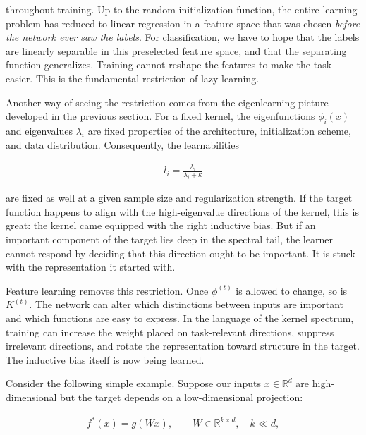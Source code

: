 throughout training. Up to the random initialization function, the entire learning problem has reduced to linear regression in a feature space that was chosen \textit{before the network ever saw the labels}. For classification, we have to hope that the labels are linearly separable in this preselected feature space, and that the separating function generalizes. Training cannot reshape the features to make the task easier. This is the fundamental restriction of lazy learning.

Another way of seeing the restriction comes from the eigenlearning picture developed in the previous section. For a fixed kernel, the eigenfunctions $\phi_i(x)$ and eigenvalues $\lambda_i$ are fixed properties of the architecture, initialization scheme, and data distribution. Consequently, the learnabilities

\begin{align}
    l_i = \frac{\lambda_i}{\lambda_i+\kappa}
\end{align}

are fixed as well at a given sample size and regularization strength. If the target function happens to align with the high-eigenvalue directions of the kernel, this is great: the kernel came equipped with the right inductive bias. But if an important component of the target lies deep in the spectral tail, the learner cannot respond by deciding that this direction ought to be important. It is stuck with the representation it started with.

Feature learning removes this restriction. Once $\phi^{(t)}$ is allowed to change, so is $K^{(t)}$. The network can alter which distinctions between inputs are important and which functions are easy to express. In the language of the kernel spectrum, training can increase the weight placed on task-relevant directions, suppress irrelevant directions, and rotate the representation toward structure in the target. The inductive bias itself is now being learned.

Consider the following simple example. Suppose our inputs $x\in\mathbb{R}^d$ are high-dimensional but the target depends on a low-dimensional projection:

\begin{align}
    f^*(x)=g(Wx), \qquad W\in\mathbb{R}^{k\times d}, \quad k\ll d,
\end{align}


